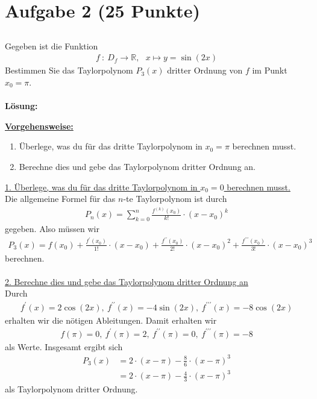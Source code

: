 \section*{Aufgabe 2 (25 Punkte)}
\vspace{0.4cm}
\subsection*{}
Gegeben ist die Funktion
\begin{align*}
f \ : \ D_f \to \mathbb{R}, \ \ \
x \mapsto y = \sin(2x) 
\end{align*}
Bestimmen Sie das Taylorpolynom $P_3(x)$ dritter Ordnung von $f$ im Punkt $x_0 = \pi$.
\\
\\
\textbf{Lösung:}
\begin{mdframed}
\underline{\textbf{Vorgehensweise:}}
\begin{enumerate}
\item Überlege, was du für das dritte Taylorpolynom in $x_0=\pi$ berechnen musst.
\item Berechne dies und gebe das Taylorpolynom dritter Ordnung an. 
\end{enumerate}
\end{mdframed}
\underline{1. Überlege, was du für das dritte Taylorpolynom in $x_0=0$ berechnen musst. }\\
Die allgemeine Formel für das $n$-te Taylorpolynom ist durch
\begin{align*}
P_n(x) = \sum \limits_{k=0}^n \frac{f^{(k)}(x_0)}{k!} \cdot (x-x_0)^k
\end{align*}
gegeben. Also müssen wir
\begin{align*}
P_3(x) 
= f(x_0) + \frac{f^\prime(x_0)}{1!}\cdot (x-x_0) + \frac{f^{\prime \prime}(x_0)}{2!}\cdot (x-x_0)^2+
\frac{f^{\prime \prime \prime}(x_0)}{3!} \cdot (x-x_0)^3
\end{align*}
berechnen.
\\
\\
\underline{2. Berechne dies und gebe das Taylorpolynom dritter Ordnung an}\\
Durch 
\begin{align*}
f^\prime(x) = 2 \cos(2x), \
f^{\prime \prime}(x) = -4 \sin(2x), \
f^{\prime \prime \prime}(x) = -8 \cos(2x)
\end{align*}
erhalten wir die nötigen Ableitungen.
Damit erhalten wir 
\begin{align*}
f(\pi) = 0, \ f^\prime(\pi)= 2, \
f^{\prime \prime}(\pi) = 0, \
f^{\prime \prime \prime}(\pi) = -8
\end{align*}
als Werte.
Insgesamt ergibt sich
\begin{align*}
P_3(x) &= 2 \cdot (x - \pi) -\frac{8}{6} \cdot (x - \pi)^3\\
&= 2 \cdot (x - \pi) - \frac{4}{3} \cdot (x - \pi)^3
\end{align*}
als Taylorpolynom dritter Ordnung.

